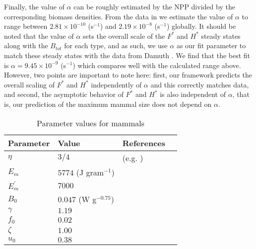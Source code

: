 \documentclass{pnastwo}
\begin{document}
\begin{article}
Finally, the value of $\alpha$ can be roughly estimated by the NPP divided by the corresponding biomass densities. From the data in \cite{michaletz2014convergence} we estimate the value of $\alpha$ to range between $2.81\times10^{-10}$ (s$^{-1}$) and $2.19\times10^{-8}$ (s$^{-1}$) globally. It should be noted that the value of $\alpha$ sets the overall scale of the $F^{*}$ and $H^{*}$ steady states along with the $B_{tot}$ for each type, and as such, we use $\alpha$ as our fit parameter to match these steady states with the data from Damuth \cite{damuth1987interspecific}. We find that the best fit is $\alpha=9.45\times10^{-9}$ (s$^{-1}$) which compares well with the calculated range above. However, two points are important to note here: first, our framework predicts the overall scaling of $F^{*}$ and $H^{*}$ independently of $\alpha$ and this correctly matches data, and second, the asymptotic behavior of $F^{*}$ and $H^{*}$ is also independent of $\alpha$, that is, our prediction of the maximum mammal size does not depend on $\alpha$.




 \begin{table}[h]
\caption{Parameter values for mammals}
\label{param}
    \begin{center}
    \small
     \begin{tabular}{ p{1.2cm} p{3.2cm} l p{2.2cm}|}
     \hline
     Parameter & Value & References  \\
     \hline
   $\eta$ & $3/4$  &  (e.g. \cite{West:2001bv,moses2008rmo,hou}) \\
   $E_{m}$ & $5774$ (J gram$^{-1}$)  &  \cite{moses2008rmo,West:2001bv,hou} \\
   $E_{m}^{\prime}$ & $7000$  & \cite{stryer,hou} \\
   $B_{0}$ & $0.047$ (W g$^{-0.75}$)    & \cite{hou}  \\
   $\gamma$ & $1.19$ & \cite{Lindstedt:1985hm} \\
   $f_{0}$ & $0.02$ & \cite{Lindstedt:1985hm}\\
   $\zeta$ & $1.00$  & \cite{Lindstedt:2002td} \\
   $u_{0}$ & $0.38$  & \cite{Lindstedt:2002td} \\


\end{tabular}
\end{center}
\end{table}
\end{article}
\end{document}
